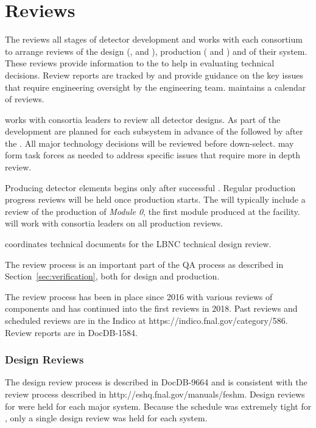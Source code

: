 \chapter{Reviews}
\label{vl:tc-review}

The  reviews all stages of detector development and works
with each consortium to arrange reviews of the design (,
 and ), production ( and
) and  of their system.  These reviews provide
information to the  to help in evaluating technical
decisions.  Review reports are tracked by  and provide
guidance on the key issues that require engineering oversight by the
 engineering team.  maintains a calendar of
 reviews.

 works with consortia leaders to review all detector
designs.  As part of the  development  are
planned for each subsystem in advance of the  followed by
 after the .  All major technology decisions
will be reviewed before down-select.   may form task forces
as needed to address specific issues that require more in depth
review.


Producing detector elements begins only after
successful . Regular production progress
reviews will be held once production starts. The 
will typically include a review of the production of \textit{Module 0}, the
first module produced at the facility.  will work with
consortia leaders on all production reviews.

 coordinates technical documents for the LBNC
technical design review.

The review process is an important part of the  QA process
as described in Section~\ref{sec:verification}, both for
design and production.

The review process has been in place since 2016 with various reviews
of  components and has continued into the first 
reviews in 2018. Past reviews and scheduled reviews are in the
 Indico at https://indico.fnal.gov/category/586.
Review reports are in DocDB-1584.

\subsection{Design Reviews}

The  design review process is described in DocDB-9664
and is consistent with the \fnal review process described in
http://eshq.fnal.gov/manuals/feshm. Design reviews for  were held for each
major system. Because the schedule was extremely tight for , only a single design review
was held for each system.

